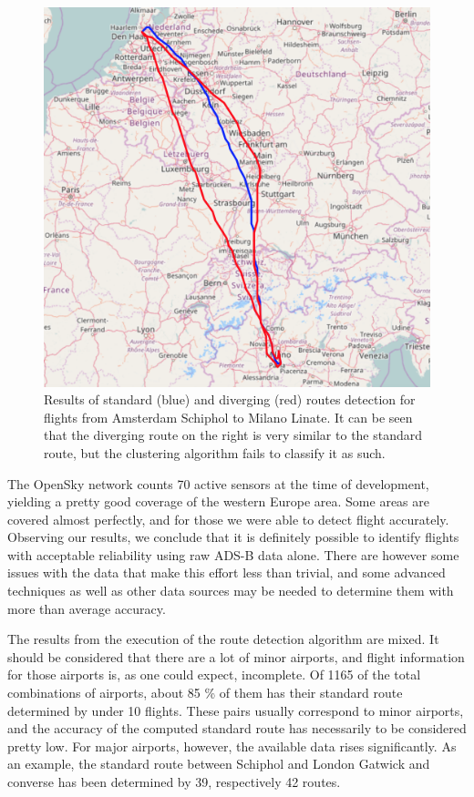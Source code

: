 \documentclass{vldb}
\begin{document}
\begin{figure}[t]
  \centering
  \includegraphics[scale=0.35]{imgs/schiphol-linate.png}
  \caption{Results of standard (blue) and diverging (red) routes detection for
    flights from Amsterdam Schiphol to Milano Linate. It can be seen that the
    diverging route on the right is very similar to the standard route, but the
    clustering algorithm fails to classify it as such.}
  \label{fig:schiphol-linate}
\end{figure}

The OpenSky network counts 70 active sensors at the time of development,
yielding a pretty good coverage of the western Europe area. Some areas are
covered almost perfectly, and for those we were able to detect flight accurately.
Observing our results, we conclude that it is definitely possible to
identify flights with acceptable reliability using raw ADS-B data alone. There
are however some issues with the data that make this effort less than
trivial, and some advanced techniques as well as other data sources may be
needed to determine them with more than average accuracy.

The results from the execution of the route detection algorithm are mixed.
It should be considered that there are a lot of minor airports, and flight
information for those airports is, as one could expect, incomplete.
Of 1165 of the total combinations of airports, about 85 \% of them has their
standard route determined by under 10 flights. These pairs usually correspond
to minor airports, and the accuracy of the computed standard route has
necessarily to be considered pretty low. For major airports, however, the
available data rises significantly. As an example, the standard route between
Schiphol and London Gatwick and converse has been determined by 39,
respectively 42 routes.
\end{document}
